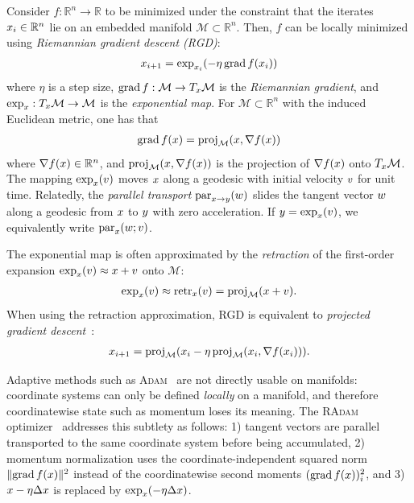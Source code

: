 Consider $f : \mathbb{R}^n \to \mathbb{R}$ to be minimized under the constraint that the iterates $x_i \in \mathbb{R}^n$ lie on an embedded manifold $\mathcal{M} \subset \mathbb{R}^n$.
Then, $f$ can be locally minimized using \textit{Riemannian gradient descent (\gls*{RGD})}:
\begin{align}\label{eqn:supp:riemannian_grad_desc}
    x_{i+1} = \exp_{x_{i}} ( -\eta \operatorname{grad}{f(x_{i})} )
\end{align}
where $\eta$ is a step size, $\operatorname{grad} f : \mathcal{M} \to T_{x} \mathcal{M}$ is the \textit{Riemannian gradient}, and $\exp_{x} : T_{x} \mathcal{M} \to \mathcal{M}$ is the \textit{exponential map}.
For $\mathcal{M} \subset \mathbb{R}^n$ with the induced Euclidean metric, one has that
\begin{align}
    \grad{f(\vv{x})} = \Proj{\mathcal{M}}{ \vv{x}, \nabla f(\vv{x}) }
\end{align}
where $\nabla f(x) \in \mathbb{R}^n$, and $\Proj{\mathcal{M}}{ \vv{x}, \nabla f(\vv{x}) }$ is the projection of $\nabla f(x)$ onto $T_{x} \mathcal{M}$.
The mapping $\exp_{x}(v)$ moves $x$ along a geodesic with initial velocity $v$ for unit time.
Relatedly, the \textit{parallel transport} $\operatorname{par}_{x \to y}(w)$ slides the tangent vector $w$ along a geodesic from $x$ to $y$ with zero acceleration.
If $y = \exp_{x}(v)$, we equivalently write $\operatorname{par}_{x}(w; v)$.

The exponential map is often approximated by the \textit{retraction} of the first-order expansion $\exp_{x}(v) \approx x + v$ onto $\mathcal{M}$:
\begin{align}
    \exp_{\vv{x}}(\vv{v}) \approx \Retr{\vv{x}}{\vv{v}} = \Proj{\mathcal{M}}{ \vv{x} + \vv{v} }.
\end{align}
When using the retraction approximation, \gls*{RGD} is equivalent to \textit{projected gradient descent}~\citep{hauswirth_projected_2016}:
\begin{align}\label{eqn:supp:general_proj_grad_desc}
    \vv{x}_{i+1} = \Proj{\mathcal{M}}{ \vv{x}_{i} -\eta \Proj{\mathcal{M}}{ \vv{x}_{i}, \nabla f(\vv{x}_{i}) } }.
\end{align}

Adaptive methods such as \textsc{Adam}~\citep{kingma_adam:_2014} are not directly usable on manifolds: coordinate systems can only be defined \textit{locally} on a manifold, and therefore coordinatewise state such as momentum loses its meaning.
The \textsc{RAdam} optimizer~\citep{becigneul_riemannian_2019} addresses this subtlety as follows: 1) tangent vectors are parallel transported to the same coordinate system before being accumulated, 2) momentum normalization uses the coordinate-independent squared norm $\lVert \operatorname{grad}{f(x)} \rVert^2$ instead of the coordinatewise second moments $(\operatorname{grad}{f(x)})_i^2$, and 3) $x - \eta \Delta x$ is replaced by $\exp_{x}(-\eta \Delta x)$.

